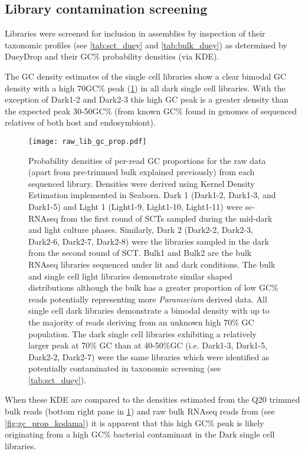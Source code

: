 \subsection{Library contamination screening}

Libraries were screened for inclusion in assemblies by inspection of their taxonomic
profiles (see \cref{tab:sct_duey} and \cref{tab:bulk_duey}) as determined by DueyDrop 
and their GC\% probability densities (via KDE).

The GC density estimates of the single cell libraries show a clear bimodal GC density
with a high 70GC\% peak (\cref{fig:gc_prop_raw}) in all dark single cell libraries. 
With the exception of Dark1-2 and Dark2-3 this high GC peak is a greater density
than the expected peak 30-50GC\% (from known GC\% found in genomes
of sequenced relatives of both host and endosymbiont).

\begin{figure}[h!]
    \texttt{[image: raw\_lib\_gc\_prop.pdf]}
    \caption[GC densities of libraries]{Probability densities of per-read GC proportions for the raw data (apart from pre-trimmed bulk explained previously)
        from each sequenced library.
        Densities were derived using Kernel Density Estimation implemented in Seaborn. 
        Dark 1 (Dark1-2, Dark1-3, and Dark1-5) and Light 1 (Light1-9, Light1-10, Light1-11) 
        were sc-RNAseq from the first round of SCTs sampled during the mid-dark and light 
        culture phases.  Similarly, Dark 2 (Dark2-2, Dark2-3, Dark2-6, Dark2-7, Dark2-8)
        were the libraries sampled in the dark from the second round of SCT.  Bulk1 and Bulk2
        are the bulk RNAseq libraries sequenced under lit and dark conditions. 
        The bulk and single cell light libraries demonstrate similar shaped distributions
        although the bulk has a greater proportion of low GC\% reads potentially representing
        more \textit{Paramecium} derived data. All single cell dark libraries 
        demonstrate a bimodal density with up to the majority of reads deriving 
        from an unknown high 70\% GC population. The dark single cell libraries
        exhibiting a relatively larger peak at 70\% GC than at 40-50\%GC (i.e.
        Dark1-3, Dark1-5, Dark2-2, Dark2-7) were
        the same libraries which were identified as potentially contaminated
        in taxonomic screening (see \cref{tab:sct_duey}).
    }
    \label{fig:gc_prop_raw}
\end{figure}

When these KDE are compared to the densities estimated from the Q20 trimmed
bulk reads (bottom right pane in \cref{fig:gc_prop_raw}) and 
raw bulk RNAseq reads from \citep{Kodama2014} (see \cref{fig:gc_prop_kodama}) 
it is apparent that this high GC\% peak is likely originating from
a high GC\% bacterial contaminant in the Dark single cell libraries.  

